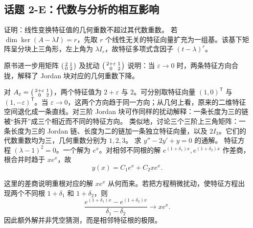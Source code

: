 \subsection*{话题 2-E：代数与分析的相互影响}
证明：线性变换特征值的几何重数不超过其代数重数。
\pf 若 $\dim\ker(A-\lambda I)=r$，先取 $r$ 个线性无关的特征向量扩充为一组基。该基下矩阵呈分块上三角形，左上角为 $\lambda I_r$，故特征多项式含因子 $(t-\lambda)^r$。
\par 原书进一步用矩阵 $\begin{psmallmatrix}2&1\\0&2\end{psmallmatrix}$ 及扰动 $\begin{psmallmatrix}2+\varepsilon&1\\0&2\end{psmallmatrix}$ 说明：当 $\varepsilon\to0$ 时，两条特征方向合拢，解释了 Jordan 块对应的几何重数下降。
\par 对 $A_\varepsilon=\begin{psmallmatrix}2+\varepsilon&1\\0&2\end{psmallmatrix}$，两个特征值为 $2+\varepsilon$ 与 $2$。可分别取特征向量 $(1,0)^\mathsf T$ 与 $(1,-\varepsilon)^\mathsf T$。当 $\varepsilon\to0$，这两个方向趋于同一方向；从几何上看，原来的二维特征空间退化成一条直线。对三阶 Jordan 块可作同样的扰动解释：一条长度为三的链被“拆开”成三个相近而不同的特征方向。
类似地，讨论三个三阶上三角矩阵：一条长度为三的 Jordan 链、长度为二的链加一条独立特征向量，以及 $2I_3$。它们的代数重数均为三，几何重数分别为 $1,2,3$。
求 $y''-2y'+y=0$ 的通解。
\sol 特征方程 $(\lambda-1)^2=0$。一个解为 $e^x$。对相邻不同根的解 $e^{(1+\delta_1)x},e^{(1+\delta_2)x}$ 作差商，根合并时趋于 $xe^x$，故
\[y(x)=C_1e^x+C_2xe^x.\]
\par 这里的差商说明重根对应的解 $xe^x$ 从何而来。若把方程稍微扰动，使特征方程出现两个不同根 $1+\delta_1$ 和 $1+\delta_2$，则
\[\frac{e^{(1+\delta_1)x}-e^{(1+\delta_2)x}}{\delta_1-\delta_2}\longrightarrow xe^x.\]
因此额外解并非凭空猜测，而是相邻特征根的极限。

